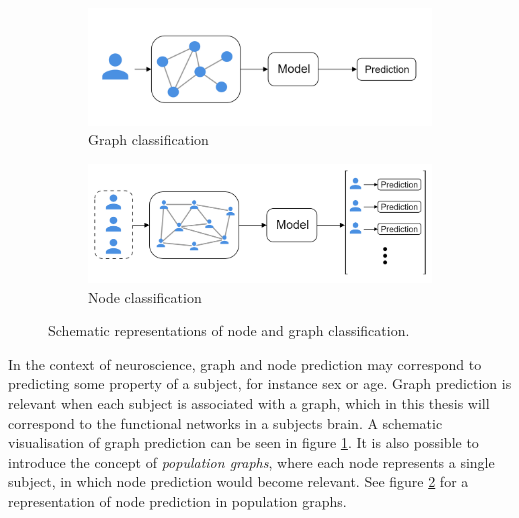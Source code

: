 \begin{figure}[H]
    \centering
        \begin{subfigure}{.5\textwidth}
            \centering
            \includegraphics[width=1\linewidth]{chapters/images_theory/graph_classification.png}
            \caption{Graph classification}
            \label{fig:subject_prediction}
        \end{subfigure}%
        \begin{subfigure}{.5\textwidth}
            \centering
            \includegraphics[width=1\linewidth]{chapters/images_theory/node_classification.png}
            \caption{Node classification}
            \label{fig:population_prediction}
        \end{subfigure}
    \caption{Schematic representations of node and graph classification.}
    \label{fig:graph_and_node_class}
\end{figure}

In the context of neuroscience, graph and node prediction may correspond to predicting some property of a subject, for instance sex or age. Graph prediction is relevant when each subject is associated with a graph, which in this thesis will correspond to the functional networks in a subjects brain. A schematic visualisation of graph prediction can be seen in figure \ref{fig:subject_prediction}. It is also possible to introduce the concept of \textit{population graphs}, where each node represents a single subject, in which node prediction would become relevant. See figure \ref{fig:population_prediction} for a representation of node prediction in population graphs. 

